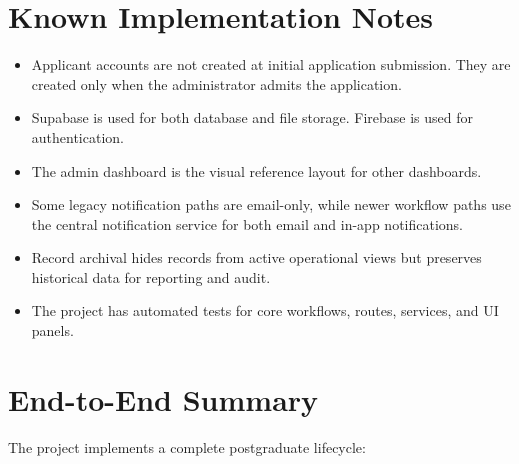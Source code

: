 \documentclass[11pt,a4paper]{article}
\begin{document}
\section{Known Implementation Notes}

\begin{itemize}
  \item Applicant accounts are not created at initial application submission. They are created only when the administrator admits the application.
  \item Supabase is used for both database and file storage. Firebase is used for authentication.
  \item The admin dashboard is the visual reference layout for other dashboards.
  \item Some legacy notification paths are email-only, while newer workflow paths use the central notification service for both email and in-app notifications.
  \item Record archival hides records from active operational views but preserves historical data for reporting and audit.
  \item The project has automated tests for core workflows, routes, services, and UI panels.
\end{itemize}

\newpage

\section{End-to-End Summary}

The project implements a complete postgraduate lifecycle:
\end{document}
